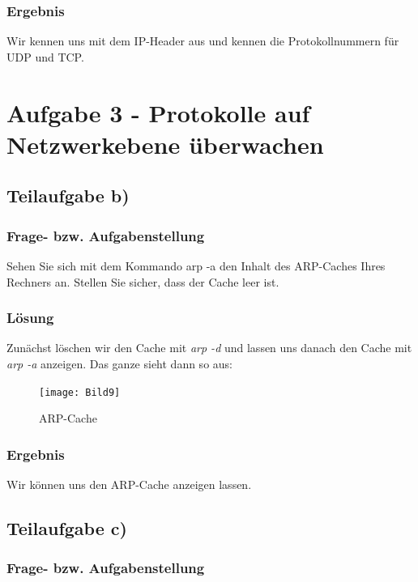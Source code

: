 \subsubsection{Ergebnis}

Wir kennen uns mit dem IP-Header aus und kennen die Protokollnummern für UDP und TCP.


\section{Aufgabe 3 - Protokolle auf Netzwerkebene überwachen}

\subsection{Teilaufgabe b)}

\subsubsection{Frage- bzw. Aufgabenstellung}

Sehen Sie sich mit dem Kommando arp -a den Inhalt des ARP-Caches Ihres Rechners an. Stellen Sie sicher, dass der Cache leer ist.

\subsubsection{Lösung}

Zunächst löschen wir den Cache mit \textit{arp -d} und lassen uns danach den Cache mit \textit{arp -a} anzeigen. Das ganze sieht dann so aus:

\begin{figure}[htbp]
\begin{center}
\texttt{[image: Bild9]}
\caption{ARP-Cache}
\label{fig:ARP-Cache}
\end{center}
\end{figure}

\subsubsection{Ergebnis}

Wir können uns den ARP-Cache anzeigen lassen.

\subsection{Teilaufgabe c)}

\subsubsection{Frage- bzw. Aufgabenstellung}

